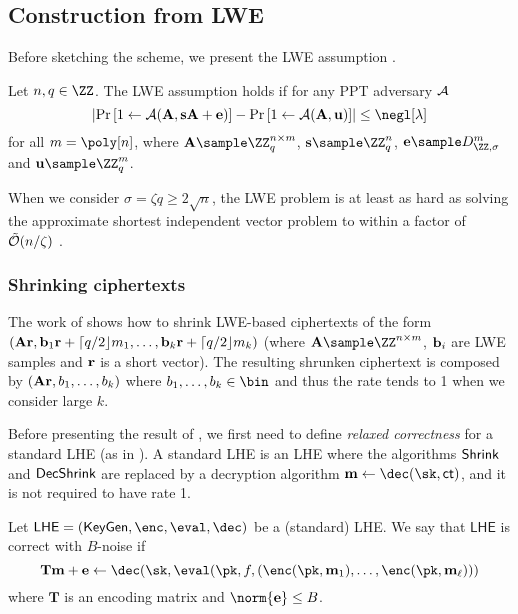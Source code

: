 \subsection{Construction from LWE}



Before sketching the scheme, we present the LWE assumption \cite{STOC:Regev05}. 

\begin{definition}
 Let $n,q\in\ZZ$. The LWE assumption holds if for any PPT adversary $\mathcal{A}$ $$\left|\Pr\left[1\leftarrow\Ac(\An,\sn\An+\en)\right]-\Pr\left[1\leftarrow\Ac(\An,\un)\right]\right|\leq \negl[\lambda]$$  for all $m=\poly[n]$, where $\An\sample \ZZ_q^{n\times m}$, $\sn\sample \ZZ_q^n$, $\en\sample D^m_{\ZZ,\sigma}$ and $\un\sample \ZZ_q^m$.
  \end{definition}{}

When we consider $\sigma=\zeta q \geq 2\sqrt{n}$, the LWE problem is at least as hard as solving the approximate shortest independent vector problem to within a factor of $\tilde {\mathcal{O}}(n/\zeta)$ \cite{STOC:Regev05}. 




\subsubsection{Shrinking ciphertexts} 
The work of \cite{TCC:BDGM19} shows how to shrink LWE-based ciphertexts of the form $(\mathbf{A}\mathbf{r},\mathbf{b}_1\mathbf{r}  + \lceil q/2  \rfloor m_1,\dots, \mathbf{b}_k\mathbf{r}  + \lceil q/2  \rfloor m_k)$ (where $\An\sample \ZZ^{n\times m}$, $\mathbf{b}_i$ are LWE samples and $\mathbf{r}$ is a short vector). The resulting shrunken ciphertext is composed by $(\mathbf{A}\mathbf{r},b_1,\dots, b_k)$ where $b_1,\dots, b_k\in\bin$ and thus the rate tends to 1 when we consider large $k$.

Before presenting the result of \cite{TCC:BDGM19}, we first need to define \emph{relaxed correctness} for a standard LHE (as in \cite{TCC:BDGM19}). A standard LHE is an LHE where the algorithms $\mathsf{Shrink}$ and $\mathsf{DecShrink}$ are replaced by a decryption algorithm $\mn\leftarrow\dec(\sk,\ct)$, and it is not required to have rate 1. 

\begin{definition}
 Let $\mathsf{LHE}=(\keygen,\enc,\eval,\dec)$ be a (standard) LHE. We say that $\mathsf{LHE}$ is correct with $B$-noise if $$\mathbf{T}\mn+\en\leftarrow\dec(\sk,\eval(\pk,f,(\enc(\pk,\mn_1),\dots, \enc(\pk,\mn_\ell)))$$ where $\mathbf{T}$ is an encoding matrix and $\norm{\en}\leq B$.
\end{definition}


